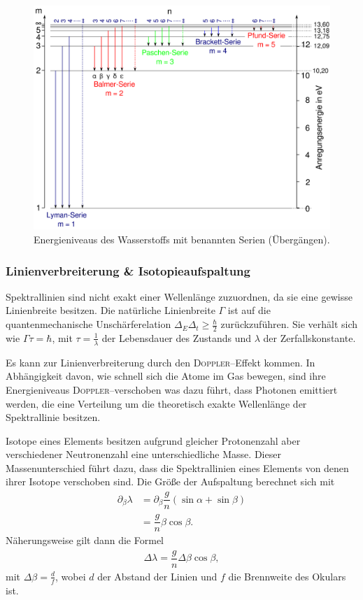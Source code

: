 \documentclass[sn-mathphys-num,iicol]{sn-jnl}
\theoremstyle{thmstyleone}
\theoremstyle{thmstyletwo}
\theoremstyle{thmstylethree}
\begin{document}
\begin{figure}[t]
        \centering
        \includegraphics[width=.5\textwidth]{402_serien.png}
        \caption{Energieniveaus des Wasserstoffs mit benannten Serien (Übergängen).\cite{WikipediaSerien}} \label{fig:serien}
\end{figure}

\subsubsection{Linienverbreiterung \& Isotopieaufspaltung}
Spektrallinien sind nicht exakt einer Wellenlänge zuzuordnen, da sie eine gewisse Linienbreite besitzen.
Die natürliche Linienbreite $\Gamma $ ist auf die quantenmechanische Unschärferelation $\Delta _E\Delta _t \geq \tfrac{\hbar }{2}$ zurückzuführen.
Sie verhält sich wie $\Gamma \tau =\hbar $, mit $\tau =\tfrac{1}{\lambda }$ der Lebensdauer des Zustands und $\lambda $ der Zerfallskonstante.

Es kann zur Linienverbreiterung durch den \textsc{Doppler}--Effekt kommen.
In Abhängigkeit davon, wie schnell sich die Atome im Gas bewegen, sind ihre Energieniveaus \textsc{Doppler}--verschoben was dazu führt, dass Photonen emittiert werden, die eine Verteilung um die theoretisch exakte Wellenlänge der Spektrallinie besitzen.

Isotope eines Elements besitzen aufgrund gleicher Protonenzahl aber verschiedener Neutronenzahl eine unterschiedliche Masse.
Dieser Massenunterschied führt dazu, dass die Spektrallinien eines Elements von denen ihrer Isotope verschoben sind.
Die Größe der Aufspaltung berechnet sich mit 
\begin{align} 
         &&&& \partial _\beta \lambda  &= \partial _\beta\dfrac{g}{n}\left(\sin \alpha +\sin \beta \right)  &&&& \\
          &&&&  &= \dfrac{g}{n}\beta \cos \beta .  &&&& 
\end{align} 
Näherungsweise gilt dann die Formel
\begin{align} 
        \Delta \lambda =\dfrac{g}{n}\Delta \beta \cos \beta
,\end{align} 
mit $\Delta \beta =\tfrac{d}{f}$, wobei $d$ der Abstand der Linien und $f$ die Brennweite des Okulars ist.
\end{document}
